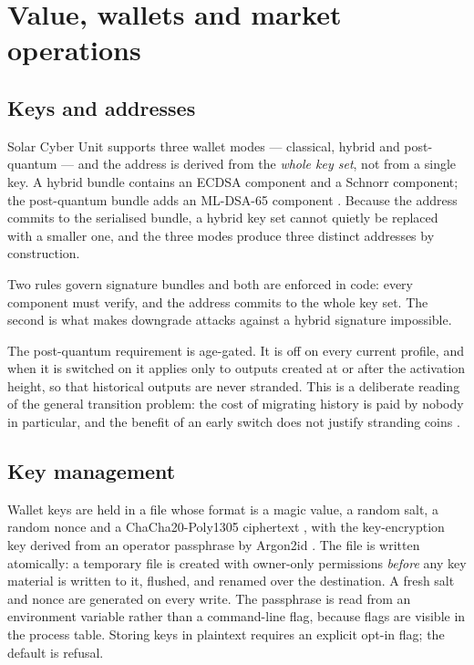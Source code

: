 \documentclass{article}
\begin{document}
\section{Value, wallets and market operations}
\label{sec:wallets}

\subsection{Keys and addresses}

Solar Cyber Unit supports three wallet modes --- classical, hybrid and post-quantum ---
and the address is derived from the \emph{whole key set}, not from a single
key. A hybrid bundle contains an ECDSA component and a Schnorr component; the
post-quantum bundle adds an ML-DSA-65 component \cite{nist-fips204}. Because
the address commits to the serialised bundle, a hybrid key set cannot quietly
be replaced with a smaller one, and the three modes produce three distinct
addresses by construction.

Two rules govern signature bundles and both are enforced in code: every
component must verify, and the address commits to the whole key set. The
second is what makes downgrade attacks against a hybrid signature impossible.

The post-quantum requirement is age-gated. It is off on every current profile,
and when it is switched on it applies only to outputs created at or after the
activation height, so that historical outputs are never stranded. This is a
deliberate reading of the general transition problem: the cost of migrating
history is paid by nobody in particular, and the benefit of an early switch
does not justify stranding coins \cite{nist-ir8547}.

\subsection{Key management}

Wallet keys are held in a file whose format is a magic value, a random salt, a
random nonce and a ChaCha20-Poly1305 ciphertext \cite{rfc8439}, with the
key-encryption key derived from an operator passphrase by Argon2id
\cite{rfc9106}. The file is written atomically: a temporary file is created
with owner-only permissions \emph{before} any key material is written to it,
flushed, and renamed over the destination. A fresh salt and nonce are generated
on every write. The passphrase is read from an environment variable rather than
a command-line flag, because flags are visible in the process table. Storing
keys in plaintext requires an explicit opt-in flag; the default is refusal.
\end{document}
